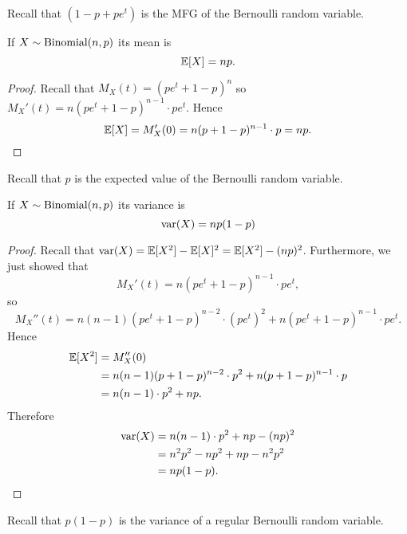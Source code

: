 \documentclass[class=article, crop=false]{standalone}
\begin{document}
  \begin{note}{}
    Recall that $(1 - p + pe^t)$ is the MFG of the Bernoulli random variable.
  \end{note}
  \begin{theorem}{}
    If $X\sim \operatorname{Binomial}(n, p)$ its mean is
    \[
      \mathbb{E}[X] = np.
    \]
    \begin{proof}
      Recall that $M_X(t) = (pe^t + 1 - p)^n$ so $M_X'(t) = n(pe^t + 1 - p)^{n - 1}\cdot pe^t$. Hence
      \[
        \mathbb{E}[X] = M_X'(0) = n(p + 1 - p)^{n - 1}\cdot p = np.
      \]
    \end{proof}
  \end{theorem}
  \begin{note}{}
    Recall that $p$ is the expected value of the Bernoulli random variable.
  \end{note}
  \begin{theorem}{}
    If $X\sim \operatorname{Binomial}(n, p)$ its variance is
    \[
      \operatorname{var}(X) = np(1 - p)
    \]
    \begin{proof}
      Recall that $\operatorname{var}(X) = \mathbb{E}[X^2] - \mathbb{E}[X]^2 = \mathbb{E}[X^2] - (np)^2$. Furthermore, we just showed that
      \[
        M_X'(t) = n(pe^t + 1 - p)^{n - 1}\cdot pe^t,
      \]
      so
      \[
        M_X''(t) = n(n - 1)(pe^t + 1 - p)^{n - 2}\cdot (pe^t)^2 + n(pe^t + 1 - p)^{n - 1}\cdot pe^t.
      \]
      Hence
      \begin{align*}
        \mathbb{E}[X^2] &= M_X''(0) \\
                &= n(n - 1)(p + 1 - p)^{n - 2}\cdot p^2 + n(p + 1 - p)^{n - 1}\cdot p \\
                &= n(n - 1)\cdot p^2 + np.
      \end{align*}
      Therefore
      \begin{align*}
        \operatorname{var}(X) &= n(n - 1)\cdot p^2 + np - (np)^2 \\
                &= n^2p^2 - np^2 + np - n^2p^2 \\
                &= np(1 - p).
      \end{align*}
    \end{proof}
  \end{theorem}
  \begin{note}{}
    Recall that $p(1 - p)$ is the variance of a regular Bernoulli random variable.
  \end{note}
\end{document}
